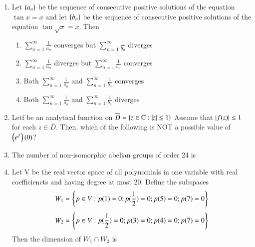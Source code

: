\documentclass[journal,12pt,onecolumn]{IEEEtran}
\theoremstyle{remark}
\begin{document}
\begin{enumerate}
		\begin{enumerate}
		\end{enumerate}
	\item Let $\left\{a_n\right\}$ be the sequence of consecutive positive solutions of the equation $\tan{x} = x$ and let $\left\{b_n\right\}$ be the sequence of consecutive positive solutions of the equation $\tan{\sqrt{x}} = x$. Then
		\begin{enumerate}
				\item $\sum_{n=1}^{\infty} \frac{1}{a_n}$ converges but $\sum_{n=1}^{\infty} \frac{1}{b_n}$ diverges
				\item $\sum_{n=1}^{\infty} \frac{1}{a_n}$ diverges but $\sum_{n=1}^{\infty} \frac{1}{b_n}$ converges
				\item Both $\sum_{n=1}^{\infty} \frac{1}{a_n}$ and $\sum_{n=1}^{\infty} \frac{1}{b_n}$ converges
				\item Both  $\sum_{n=1}^{\infty} \frac{1}{a_n}$ and $\sum_{n=1}^{\infty} \frac{1}{b_n}$ diverges
		\end{enumerate}
	\item Letf be an analytical function on $\overline{D} = \left\{z \in \mathbb{C} : \left\vert z\right\vert \leq 1\right\}$ Assume that $\left\vert f(z)\right\vert \leq 1$ for each $z \in \overline{D}$. Then, which of the following is NOT a possible value of $\left(e^f\right) (0) $?
		\begin{enumerate}
		\end{enumerate}
	\item The number of non-isomorphic abelian groups of order 24 is
	\item Let V be the real vector space of all polynomials in one variable with real coefficiencts and having degree at most 20. Define the subspaces
		$$ W_1 = \left\{p \in V : p(1) = 0 ; p(\frac{1}{2}) = 0 ; p(5) = 0 ; p(7) = 0 \right\} $$
		$$ W_2 = \left\{p \in V : p(\frac{1}{2}) = 0 ; p(3) = 0 ; p(4) = 0 ; p(7) = 0 \right\} $$
		Then the dimension of $ W_1 \cap W_2 $ is
	
\end{enumerate}
\end{document}
